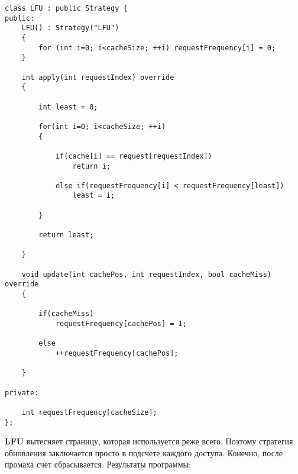 \begin{tcolorbox}
\begin{verbatim}
class LFU : public Strategy {
public:
	LFU() : Strategy("LFU")
	{
		for (int i=0; i<cacheSize; ++i) requestFrequency[i] = 0;
	}
	
	int apply(int requestIndex) override
	{
		
		int least = 0;
		
		for(int i=0; i<cacheSize; ++i)
		{
		
			if(cache[i] == request[requestIndex])
				return i;
			
			else if(requestFrequency[i] < requestFrequency[least])
				least = i;
		
		}
		
		return least;
	
	}
	
	void update(int cachePos, int requestIndex, bool cacheMiss) override
	{
		
		if(cacheMiss)
			requestFrequency[cachePos] = 1;
		
		else
			++requestFrequency[cachePos];
		
	}

private:

	int requestFrequency[cacheSize];
};
\end{verbatim}
\end{tcolorbox}

\textbf{LFU} вытесняет страницу, которая используется реже всего. Поэтому стратегия обновления заключается просто в подсчете каждого доступа. Конечно, после промаха счет сбрасывается. Результаты программы:

